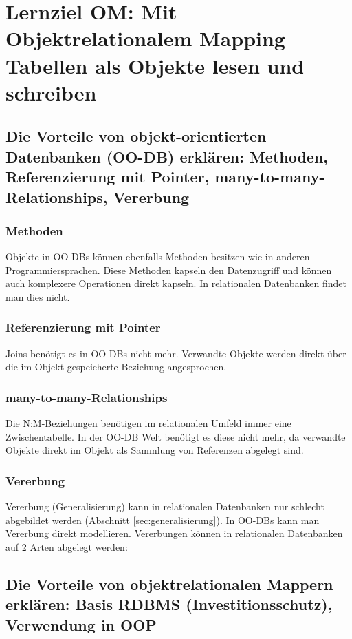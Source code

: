 \section{Lernziel OM: Mit Objektrelationalem Mapping Tabellen als Objekte lesen und schreiben}

\subsection{Die Vorteile von objekt-orientierten Datenbanken (OO-DB) erklären: Methoden, Referenzierung mit Pointer, many-to-many-Relationships, Vererbung}

\subsubsection{Methoden}
Objekte in OO-DBs können ebenfalls Methoden besitzen wie in anderen Programmiersprachen. Diese Methoden kapseln den Datenzugriff und können auch komplexere Operationen direkt kapseln. In relationalen Datenbanken findet man dies nicht.

\subsubsection{Referenzierung mit Pointer}
Joins benötigt es in OO-DBs nicht mehr. Verwandte Objekte werden direkt über die im Objekt gespeicherte Beziehung angesprochen.

\subsubsection{many-to-many-Relationships}
Die N:M-Beziehungen benötigen im relationalen Umfeld immer eine Zwischentabelle. In der OO-DB Welt benötigt es diese nicht mehr, da verwandte Objekte direkt im Objekt als Sammlung von Referenzen abgelegt sind.

\subsubsection{Vererbung}

Vererbung (Generalisierung) kann in relationalen Datenbanken nur schlecht abgebildet werden (Abschnitt \ref{sec:generalisierung}). In OO-DBs kann man Vererbung direkt modellieren.
Vererbungen können in relationalen Datenbanken auf 2 Arten abgelegt werden:

\subsection{Die Vorteile von objektrelationalen Mappern erklären: Basis RDBMS (Investitionsschutz), Verwendung in OOP}


